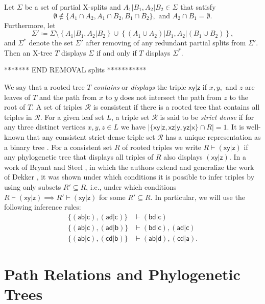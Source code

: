 \documentclass[smallextended]{svjour3}
\let\cite\citep
\newcommand{\rt}[1]{\ensuremath{\mathsf{#1}}}
\begin{document}
{\begin{lemma}
Let $\Sigma$ be a set of partial X-splits and 
$A_1|B_1, A_2|B_2 \in \Sigma$  that satisfy
\[\emptyset \notin \{A_1 \cap A_2, A_1\cap B_2, B_1 \cap B_2\}, \text{ and } 
A_2 \cap B_1 = \emptyset.\]
Furthermore, let \[\Sigma'\coloneqq \Sigma \setminus 
\left\{A_1|B_1, A_2|B_2\right\} \cup 
\left\{(A_1 \cup A_2)|B_1, A_2 |(B_1 \cup B_2 )\right\}, \]
and $\Sigma^*$ denote the set $\Sigma'$ after
removing of any redundant partial splits from $\Sigma'$.
Then an X-tree $T$ displays $\Sigma$ if and only if $T$ displays $\Sigma^*$.
\label{lem:split-replace}
\end{lemma}

 ******* END REMOVAL splits *********** 	
}

We say that a rooted tree $T$ \emph{contains} or \emph{displays} the triple
$\rt{xy|z}$ if $x,y,$ and $z$ are leaves of $T$ and the path from $x$ to
$y$ does not intersect the path from $z$ to the root of $T$. A set of
triples $\mathcal R$ is consistent if there is a rooted tree that contains
all triples in $\mathcal R$.  For a given leaf set $L$, a triple set
$\mathcal R$ is said to be \emph{strict dense} if for any three distinct
vertices $x,y,z\in L$ we have $|\{\rt{xy|z}, \rt{xz|y}, \rt{yz|x}\}\cap
R|=1$. It is well-known that any consistent strict-dense triple set
$\mathcal R$ has a unique representation as a binary tree
\cite[Suppl. Material]{Hellmuth:15a}.  For a consistent set $R$ of rooted
triples we write $R\vdash \rt{(xy|z)}$ if any phylogenetic tree that
displays all triples of $R$ also displays $\rt{(xy|z)}$. In a work of
Bryant and Steel \cite{BS:95}, in which the authors extend and generalize
the work of Dekker \cite{Dekker86}, it was shown under which conditions it
is possible to infer triples by using only subsets $R'\subseteq R$, i.e.,
under which conditions $R\vdash \rt{(xy|z)} \implies R'\vdash \rt{(xy|z)}$
for some $R'\subseteq R$. In particular, we will use the following
inference rules: \renewcommand{\theequation}{\roman{equation}}
\begin{align}
  \{\rt{(ab|c)}, \rt{(ad|c)}\} &\vdash \rt{(bd|c)} 
  \label{eq:infRule1} \\
  \{\rt{(ab|c)}, \rt{(ad|b)}\} & \vdash \rt{(bd|c)},\rt{(ad|c)} 
  \label{eq:infRule2} \\
  \{\rt{(ab|c)}, \rt{(cd|b)}\} &\vdash \rt{(ab|d)},\rt{(cd|a)}.
  \label{eq:infRule3}
\end{align}

\section{Path Relations and Phylogenetic Trees}
\label{sect:theory} 
\end{document}
